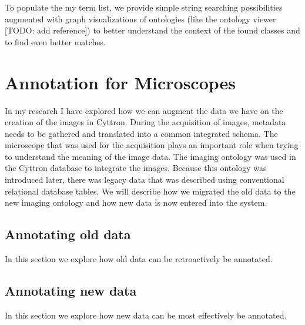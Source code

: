 To populate the my term list, we provide simple string searching
possibilities augmented with graph visualizations of ontologies (like
the ontology viewer [TODO: add reference]) to better understand the
context of the found classes and to find even better matches.


\section{Annotation for Microscopes}

In my research I have explored how we can augment the data we have on
the creation of the images in Cyttron. During
the
acquisition
of images, metadata needs to be gathered and
translated into a common integrated schema. The
microscope that was used for the acquisition plays
an important role when trying to understand the meaning of the image
data. The imaging ontology was used in the Cyttron database to
integrate the images. Because this ontology was introduced later,
there was legacy data that was described using conventional relational
database tables. We will describe how we migrated the old data to the
new imaging ontology and how new data is now entered into the system.


\subsection{Annotating old data}

In this section we explore how old data can be retroactively be
annotated.


\subsection{Annotating new data}

In this section we explore how new data can be most effectively be
annotated.
